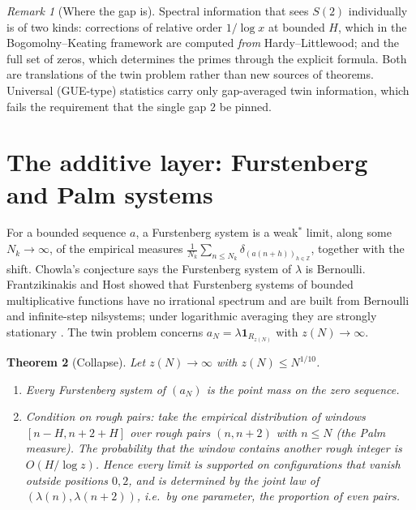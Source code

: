 \documentclass[11pt]{amsart}
\newtheorem{theorem}{Theorem}[section]
\theoremstyle{definition}
\theoremstyle{remark}
\newtheorem{remark}[theorem]{Remark}
\newcommand{\Z}{\mathbb{Z}}
\newcommand{\one}{\mathbf 1}
\begin{document}
\begin{remark}[Where the gap is]
Spectral information that sees $S(2)$ individually is of two kinds: corrections of relative order $1/\log x$ at bounded $H$, which in the Bogomolny--Keating framework are computed \emph{from} Hardy--Littlewood; and the full set of zeros, which determines the primes through the explicit formula. Both are translations of the twin problem rather than new sources of theorems. Universal (GUE-type) statistics carry only gap-averaged twin information, which fails the requirement that the single gap $2$ be pinned.
\end{remark}

\section{The additive layer: Furstenberg and Palm systems}\label{sec:ergodic}

For a bounded sequence $a$, a Furstenberg system is a weak$^*$ limit, along some $N_k\to\infty$, of the empirical measures $\frac1{N_k}\sum_{n\le N_k}\delta_{(a(n+h))_{h\in\Z}}$, together with the shift. Chowla's conjecture says the Furstenberg system of $\lambda$ is Bernoulli. Frantzikinakis and Host \cite{FH21} showed that Furstenberg systems of bounded multiplicative functions have no irrational spectrum and are built from Bernoulli and infinite-step nilsystems; under logarithmic averaging they are strongly stationary \cite{Fra17}. The twin problem concerns $a_N=\lambda\one_{R_{z(N)}}$ with $z(N)\to\infty$.

\begin{theorem}[Collapse]\label{thm:collapse}
Let $z(N)\to\infty$ with $z(N)\le N^{1/10}$.
\begin{enumerate}
\item[(i)] Every Furstenberg system of $(a_N)$ is the point mass on the zero sequence.
\item[(ii)] Condition on rough pairs: take the empirical distribution of windows $[n-H,n+2+H]$ over rough pairs $(n,n+2)$ with $n\le N$ (the Palm measure). The probability that the window contains another rough integer is $O(H/\log z)$. Hence every limit is supported on configurations that vanish outside positions $0,2$, and is determined by the joint law of $(\lambda(n),\lambda(n+2))$, i.e.\ by one parameter, the proportion of even pairs.
\end{enumerate}
\end{theorem}
\end{document}
